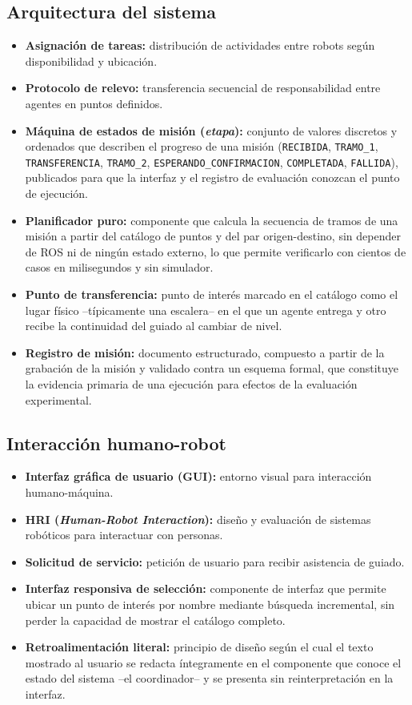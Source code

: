 \documentclass[12pt,letterpaper]{article}
\begin{document}
\subsection{Arquitectura del sistema}
\begin{itemize}[leftmargin=*]
    \item \textbf{Asignación de tareas:} distribución de actividades entre robots según disponibilidad y ubicación.
    \item \textbf{Protocolo de relevo:} transferencia secuencial de responsabilidad entre agentes en puntos definidos.
    \item \textbf{Máquina de estados de misión (\textit{etapa}):} conjunto de valores discretos y ordenados que describen el progreso de una misión (\texttt{RECIBIDA}, \texttt{TRAMO\_1}, \texttt{TRANSFERENCIA}, \texttt{TRAMO\_2}, \texttt{ESPERANDO\_CONFIRMACION}, \texttt{COMPLETADA}, \texttt{FALLIDA}), publicados para que la interfaz y el registro de evaluación conozcan el punto de ejecución.
    \item \textbf{Planificador puro:} componente que calcula la secuencia de tramos de una misión a partir del catálogo de puntos y del par origen-destino, sin depender de ROS ni de ningún estado externo, lo que permite verificarlo con cientos de casos en milisegundos y sin simulador.
    \item \textbf{Punto de transferencia:} punto de interés marcado en el catálogo como el lugar físico --típicamente una escalera-- en el que un agente entrega y otro recibe la continuidad del guiado al cambiar de nivel.
    \item \textbf{Registro de misión:} documento estructurado, compuesto a partir de la grabación de la misión y validado contra un esquema formal, que constituye la evidencia primaria de una ejecución para efectos de la evaluación experimental.
\end{itemize}

\subsection{Interacción humano-robot}
\begin{itemize}[leftmargin=*]
    \item \textbf{Interfaz gráfica de usuario (GUI):} entorno visual para interacción humano-máquina.
    \item \textbf{HRI (\textit{Human-Robot Interaction}):} diseño y evaluación de sistemas robóticos para interactuar con personas.
    \item \textbf{Solicitud de servicio:} petición de usuario para recibir asistencia de guiado.
    \item \textbf{Interfaz responsiva de selección:} componente de interfaz que permite ubicar un punto de interés por nombre mediante búsqueda incremental, sin perder la capacidad de mostrar el catálogo completo.
    \item \textbf{Retroalimentación literal:} principio de diseño según el cual el texto mostrado al usuario se redacta íntegramente en el componente que conoce el estado del sistema --el coordinador-- y se presenta sin reinterpretación en la interfaz.
\end{itemize}
\end{document}
